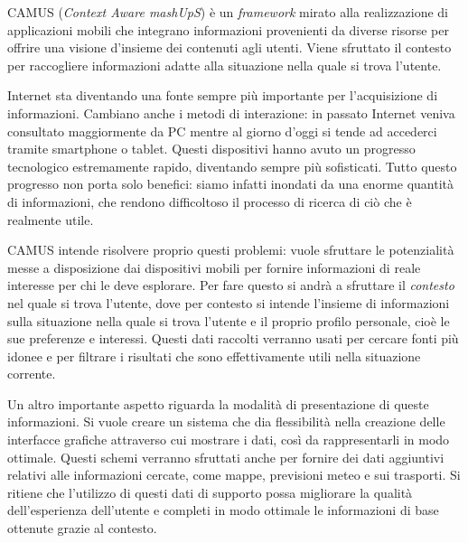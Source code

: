 CAMUS (\emph{Context Aware mashUpS}) è un \emph{framework} mirato alla realizzazione di applicazioni mobili che integrano informazioni provenienti da diverse risorse per offrire una visione d'insieme dei contenuti agli utenti. Viene sfruttato il contesto per raccogliere informazioni adatte alla situazione nella quale si trova l'utente.

Internet sta diventando una fonte sempre più importante per l'acquisizione di informazioni. Cambiano anche i metodi di interazione: in passato Internet veniva consultato maggiormente da PC mentre al giorno d'oggi si tende ad accederci tramite smartphone o tablet. Questi dispositivi hanno avuto un progresso tecnologico estremamente rapido, diventando sempre più sofisticati. Tutto questo progresso non porta solo benefici: siamo infatti inondati da una enorme quantità di informazioni, che rendono difficoltoso il processo di ricerca di ciò che è realmente utile.

CAMUS intende risolvere proprio questi problemi: vuole sfruttare le potenzialità messe a disposizione dai dispositivi mobili per fornire informazioni di reale interesse per chi le deve esplorare. Per fare questo si andrà a sfruttare il \emph{contesto} nel quale si trova l'utente, dove per contesto si intende l'insieme di informazioni sulla situazione nella quale si trova l'utente e il proprio profilo personale, cioè le sue preferenze e interessi. Questi dati raccolti verranno usati per cercare fonti più idonee e per filtrare i risultati che sono effettivamente utili nella situazione corrente.

Un altro importante aspetto riguarda la modalità di presentazione di queste informazioni. Si vuole creare un sistema che dia flessibilità nella creazione delle interfacce grafiche attraverso cui mostrare i dati, così da rappresentarli in modo ottimale. Questi schemi verranno sfruttati anche per fornire dei dati aggiuntivi relativi alle informazioni cercate, come mappe, previsioni meteo e sui trasporti. Si ritiene che l'utilizzo di questi dati di supporto possa migliorare la qualità dell'esperienza dell'utente e completi in modo ottimale le informazioni di base ottenute grazie al contesto.